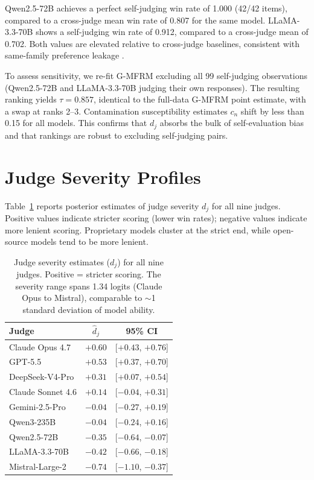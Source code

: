 Qwen2.5-72B achieves a perfect self-judging win rate of 1.000 (42/42 items), compared to a cross-judge mean win rate of 0.807 for the same model. LLaMA-3.3-70B shows a self-judging win rate of 0.912, compared to a cross-judge mean of 0.702. Both values are elevated relative to cross-judge baselines, consistent with same-family preference leakage \citep{preference_leakage2026}.

To assess sensitivity, we re-fit G-MFRM excluding all 99 self-judging observations (Qwen2.5-72B and LLaMA-3.3-70B judging their own responses). The resulting ranking yields $\tau = 0.857$, identical to the full-data G-MFRM point estimate, with a swap at ranks 2--3. Contamination susceptibility estimates $c_n$ shift by less than 0.15 for all models. This confirms that $d_j$ absorbs the bulk of self-evaluation bias and that rankings are robust to excluding self-judging pairs.


\section{Judge Severity Profiles}
\label{app:judge_severity}

Table~\ref{tab:judge_severity} reports posterior estimates of judge severity $d_j$ for all nine judges. Positive values indicate stricter scoring (lower win rates); negative values indicate more lenient scoring. Proprietary models cluster at the strict end, while open-source models tend to be more lenient.

\begin{table}[h]
\centering
\small
\begin{tabular}{lcc}
\toprule
\textbf{Judge} & $\hat{d}_j$ & 95\% CI \\
\midrule
Claude Opus 4.7 & $+0.60$ & [$+0.43$, $+0.76$] \\
GPT-5.5 & $+0.53$ & [$+0.37$, $+0.70$] \\
DeepSeek-V4-Pro & $+0.31$ & [$+0.07$, $+0.54$] \\
Claude Sonnet 4.6 & $+0.14$ & [$-0.04$, $+0.31$] \\
Gemini-2.5-Pro & $-0.04$ & [$-0.27$, $+0.19$] \\
Qwen3-235B & $-0.04$ & [$-0.24$, $+0.16$] \\
Qwen2.5-72B & $-0.35$ & [$-0.64$, $-0.07$] \\
LLaMA-3.3-70B & $-0.42$ & [$-0.66$, $-0.18$] \\
Mistral-Large-2 & $-0.74$ & [$-1.10$, $-0.37$] \\
\bottomrule
\end{tabular}
\caption{Judge severity estimates ($d_j$) for all nine judges. Positive = stricter scoring. The severity range spans 1.34 logits (Claude Opus to Mistral), comparable to $\sim$1 standard deviation of model ability.}
\label{tab:judge_severity}
\end{table}


